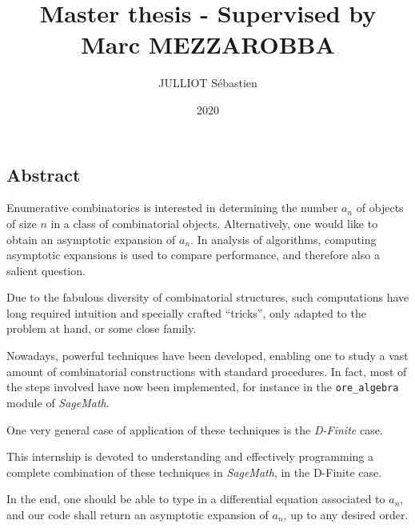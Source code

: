\documentclass[a4paper, 12pt]{report}
\author{JULLIOT Sébastien}
\date{2020}
\title{Master thesis -	Supervised by Marc MEZZAROBBA}
\begin{document}


\clearpage
\vspace*{\fill}
\begin{center}
	\begin{minipage}{.8\textwidth}
		\begin{center}{\section*{Abstract}}\end{center}
		Enumerative combinatorics is interested in determining the number $a_n$ of objects of size $n$ in a class of combinatorial objects. Alternatively, one would like to obtain an asymptotic expansion of $a_n$. In analysis of algorithms, computing asymptotic expansions is used to compare performance, and therefore also a salient question.

		Due to the fabulous diversity of combinatorial structures, such computations have long required intuition and specially crafted ``tricks'', only adapted to the problem at hand, or some close family.

		Nowadays, powerful techniques have been developed, enabling one to study a vast amount of combinatorial constructions with standard procedures. In fact, most of the steps involved have now been implemented, for instance in the \verb|ore_algebra| module of \textit{SageMath}.

		One very general case of application of these techniques is the \textit{D-Finite} case.

		This internship is devoted to understanding and effectively programming a complete combination of these techniques in \textit{SageMath}, in the D-Finite case.

		In the end, one should be able to type in a differential equation associated to $a_n$, and our code shall return an asymptotic expansion of $a_n$, up to any desired order.
	\end{minipage}
\end{center}
\vfill %
\clearpage

\tableofcontents



\printbibliography
\end{document}
